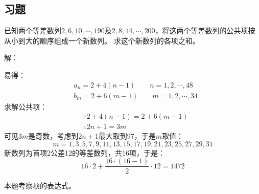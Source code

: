 \subsection{习题}

\begin{example}
已知两个等差数列$2,6,10,\cdots ,190$及$2,8,14,\cdots ,200$，将这两个等差数列的公共项按从小到大的顺序组成一个新数列。
求这个新数列的各项之和。
\end{example}

解：

易得：
\begin{align*}
&a_n=2+4\left( n-1 \right) \qquad n=1,2,\cdots ,48 \\
&b_m=2+6\left( m-1 \right) \qquad m=1,2,\cdots ,34
\end{align*}
求解公共项：
\begin{align*}
&\because 2+4\left( n-1 \right) =2+6\left( m-1 \right) \\
&\therefore 2n+1=3m
\end{align*}
可见$3m$是奇数，考虑到$2n+1$最大取到97，于是$m$取值：
\[
m=1,3,5,7,9,11,13,15,17,19,21,23,25,27,29,31
\]
新数列为首项2公差12的等差数列，共16项，于是：
\[
16\cdot 2+\frac{16\cdot \left( 16-1 \right)}{2}\cdot 12=1472
\]

\begin{tcolorbox}
本题考察项的表达式。
\end{tcolorbox}




